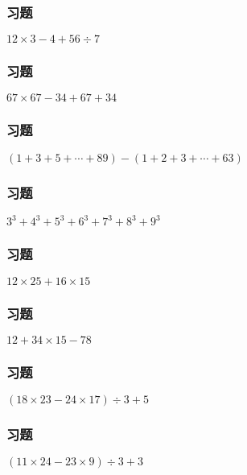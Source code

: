 \begin{frame}
    \frametitle{习题\theframecounter}
    \vspace*{-3cm}
    \centering\textit{\Large $12\times 3 - 4 + 56\div 7$}
\end{frame}

\begin{frame}
    \frametitle{习题\theframecounter} 
    \vspace*{-3cm}   
    \centering\textit{\Large $67\times 67 - 34 + 67 + 34$}
\end{frame}

\begin{frame}
    \frametitle{习题\theframecounter} 
    \vspace*{-3cm}   
    \centering\textit{\Large $(1+3+5+\cdots + 89) - (1+2+3+\cdots + 63)$}
\end{frame}

\begin{frame}
    \frametitle{习题\theframecounter}  
    \vspace*{-3cm}  
    \centering\textit{\Large $3^3 + 4^3 + 5^3 + 6^3 + 7^3 + 8^3 + 9^3$}
\end{frame}

\begin{frame}
    \frametitle{习题\theframecounter} 
    \vspace*{-3cm}   
    \centering\textit{\Large $12\times 25 + 16\times 15$}
\end{frame}

\begin{frame}
    \frametitle{习题\theframecounter}
    \vspace*{-3cm}
    \centering\textit{\Large $12 + 34\times 15 -78$}
\end{frame}

\begin{frame}
    \frametitle{习题\theframecounter}
    \vspace*{-3cm}
    \centering\textit{\Large $(18\times 23 - 24\times 17)\div 3 + 5$}
\end{frame}

\begin{frame}
    \frametitle{习题\theframecounter}
    \vspace*{-3cm}
    \centering\textit{\Large $(11\times 24 - 23\times 9)\div 3 + 3$}
\end{frame}

